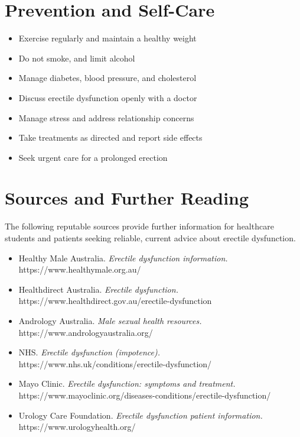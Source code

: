 \section*{Prevention and Self-Care}
\begin{itemize}
    \item Exercise regularly and maintain a healthy weight
    \item Do not smoke, and limit alcohol
    \item Manage diabetes, blood pressure, and cholesterol
    \item Discuss erectile dysfunction openly with a doctor
    \item Manage stress and address relationship concerns
    \item Take treatments as directed and report side effects
    \item Seek urgent care for a prolonged erection
\end{itemize}

\section*{Sources and Further Reading}
The following reputable sources provide further information for healthcare students and patients seeking reliable, current advice about erectile dysfunction.
\begin{itemize}
    \item Healthy Male Australia. \textit{Erectile dysfunction information.} https://www.healthymale.org.au/
    \item Healthdirect Australia. \textit{Erectile dysfunction.} https://www.healthdirect.gov.au/erectile-dysfunction
    \item Andrology Australia. \textit{Male sexual health resources.} https://www.andrologyaustralia.org/
    \item NHS. \textit{Erectile dysfunction (impotence).} https://www.nhs.uk/conditions/erectile-dysfunction/
    \item Mayo Clinic. \textit{Erectile dysfunction: symptoms and treatment.} https://www.mayoclinic.org/diseases-conditions/erectile-dysfunction/
    \item Urology Care Foundation. \textit{Erectile dysfunction patient information.} https://www.urologyhealth.org/
\end{itemize}
